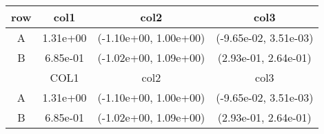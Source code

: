 \begin{tabular}{cccc}
\toprule
row&col1&col2&col3\tabularnewline
\midrule
A&1.31e+00& (-1.10e+00, 1.00e+00)& (-9.65e-02, 3.51e-03)\tabularnewline
B&6.85e-01& (-1.02e+00, 1.09e+00)& (2.93e-01, 2.64e-01)\tabularnewline
\midrule
&COL1&col2&col3\tabularnewline
\midrule
A&1.31e+00& (-1.10e+00, 1.00e+00)& (-9.65e-02, 3.51e-03)\tabularnewline
B&6.85e-01& (-1.02e+00, 1.09e+00)& (2.93e-01, 2.64e-01)\tabularnewline
\bottomrule
\end{tabular}
